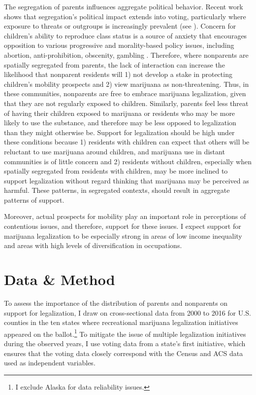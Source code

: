 The segregation of parents influences aggregate political behavior. Recent work shows that segregation's political impact extends into voting, particularly where exposure to threats or outgroups is increasingly prevalent (see \citealt{andrews_and_seguin_2015}). Concern for children's ability to reproduce class status is a source of anxiety that encourages opposition to various progressive and morality-based policy issues, including abortion, anti-prohibition, obscenity, gambling \citep{owens_2016,schnabel_and_sevell_2017,luker_1984,gusfield_1963,beisel_1997}. Therefore, where nonparents are spatially segregated from parents, the lack of interaction can increase the likelihood that nonparent residents will 1) not develop a stake in protecting children's mobility prospects and 2) view marijuana as non-threatening. Thus, in these communities, nonparents are free to embrace marijuana legalization, given that they are not regularly exposed to children. Similarly, parents feel less threat of having their children exposed to marijuana or residents who may be more likely to use the substance, and therefore may be less opposed to legalization than they might otherwise be. Support for legalization should be high under these conditions because 1) residents with children can expect that others will be reluctant to use marijuana around children, and marijuana use in distant communities is of little concern and 2) residents without children, especially when spatially segregated from residents with children, may be more inclined to support legalization without regard thinking that marijuana may be perceived as harmful. These patterns, in segregated contexts, should result in aggregate patterns of support.

Moreover, actual prospects for mobility play an important role in perceptions of contentious issues, and therefore, support for these issues. I expect support for marijuana legalization to be especially strong in areas of low income inequality and areas with high levels of diversification in occupations. 


\section{Data \& Method}

To assess the importance of the distribution of parents and nonparents on support for legalization, I draw on cross-sectional data from 2000 to 2016 for U.S. counties in the ten states where recreational marijuana legalization initiatives appeared on the ballot.\footnote{I exclude Alaska for data reliability issues.} To mitigate the issue of multiple legalization initiatives during the observed years, I use voting data from a state's first initiative, which ensures that the voting data closely correspond with the Census and ACS data used as independent variables. 




